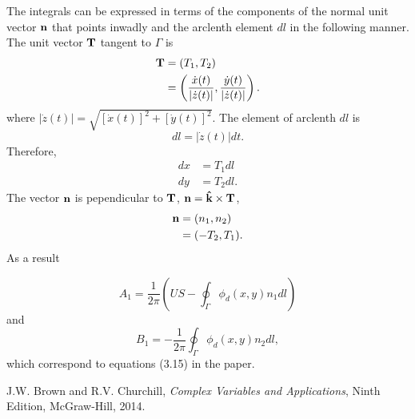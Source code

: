 \documentclass[11pt]{article}
\begin{document}
    The integrals can be expressed in terms of the components of the normal unit vector ${\bf n}$ that points inwadly and the arclenth element $dl$ in the following manner. The unit vector ${\bf T}$ tangent to $\Gamma$ is
    \begin{align}
      \label{eq:13}
      {\bf T} &= (T_1, T_2) \\
              &=  \left( \frac{\dot{x}(t)}{|\dot{z}(t)|}, \frac{\dot{y}(t)}{|\dot{z}(t)|} \right).
    \end{align}
    where $|\dot{z}(t)| = \sqrt{[\dot{x}(t)]^2 + [\dot{y}(t)]^2}$. The element of arclenth $dl$ is
  \begin{equation}
    \label{eq:6}
    dl = |\dot{z}(t)| dt.
  \end{equation}
  Therefore,
  \begin{align}
    dx &= T_1 dl \\
    dy &= T_2 dl.
  \end{align}
  The vector ${\bf n}$ is pependicular to ${\bf T}$, ${\bf n} = {\bf\hat{k}} \times {\bf T}$,
  \begin{align}
    {\bf n} &= (n_1, n_2) \\
            &= (-T_2, T_1).
  \end{align}
  As a result


  \begin{equation}
    \label{eq:9}
    \boxed{
      A_1 = \frac{1}{2\pi}\left(U S - \oint_\Gamma \phi_d(x,y)n_1 dl \right)
      }
  \end{equation}
  and
  \begin{equation}
    \label{eq:11}
    \boxed{
      B_1 = -\frac{1}{2\pi}\oint_\Gamma \phi_d(x,y) n_2 dl,
      }
    \end{equation}
 which correspond to equations (3.15) in the paper.
\begin{thebibliography}{99}
J.W. Brown and R.V. Churchill, {\it Complex Variables and Applications}, Ninth Edition, McGraw-Hill, 2014.
\end{thebibliography}




 
\end{document}
